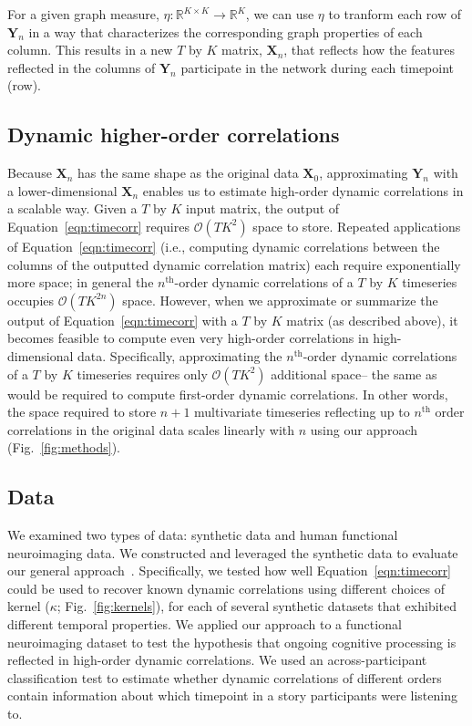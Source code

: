 \documentclass[english]{article}
\begin{document}
For a given graph measure,
$\eta: \mathbb{R}^{K \times K} \rightarrow \mathbb{R}^K$, we can use
$\eta$ to tranform each row of $\mathbf{Y}_n$ in a way that
characterizes the corresponding graph properties of each
column.  This results in a new $T$ by $K$ matrix, $\mathbf{X}_n$, that
reflects how the features reflected in the columns of $\mathbf{Y}_n$
participate in the network during each timepoint (row).


\subsection*{Dynamic higher-order correlations}

Because $\mathbf{X}_n$ has the same shape as the original data
$\mathbf{X}_0$, approximating $\mathbf{Y}_n$ with a lower-dimensional
$\mathbf{X}_n$ enables us to estimate high-order dynamic correlations
in a scalable way.  Given a $T$ by $K$ input matrix, the output of
Equation~\ref{eqn:timecorr} requires $\mathcal{O}(TK^2)$ space to
store.  Repeated applications of Equation~\ref{eqn:timecorr} (i.e.,
computing dynamic correlations between the columns of the outputted
dynamic correlation matrix) each require exponentially more space; in
general the $n^\mathrm{th}$-order dynamic correlations of a $T$ by $K$
timeseries occupies $\mathcal{O}(TK^{2n})$ space.  However, when we
approximate or summarize the output of Equation~\ref{eqn:timecorr} with a $T$ by
$K$ matrix (as described above), it becomes feasible to compute even
very high-order correlations in high-dimensional data.  Specifically,
approximating the $n^\mathrm{th}$-order dynamic correlations of a $T$
by $K$ timeseries requires only $\mathcal{O}(TK^2)$ additional space--
the same as would be required to compute first-order dynamic
correlations. In other words, the space required to store $n+1$
multivariate timeseries reflecting up to $n^\mathrm{th}$ order
correlations in the original data scales linearly with $n$ using our
approach (Fig.~\ref{fig:methods}).

\subsection*{Data}
We examined two types of data: synthetic data and human functional
neuroimaging data.  We constructed and leveraged the synthetic data to
evaluate our general approach~\citep[for a related approach,
see][]{ThomEtal18}.  Specifically, we tested how well
Equation~\ref{eqn:timecorr} could be used to recover known dynamic
correlations using different choices of kernel ($\kappa$;
Fig.~\ref{fig:kernels}), for each of several synthetic datasets that
exhibited different temporal properties.  We applied our approach to a
functional neuroimaging dataset to test the hypothesis that ongoing
cognitive processing is reflected in high-order dynamic correlations.
We used an across-participant classification test to estimate whether
dynamic correlations of different orders contain information about
which timepoint in a story participants were listening to.
\end{document}
